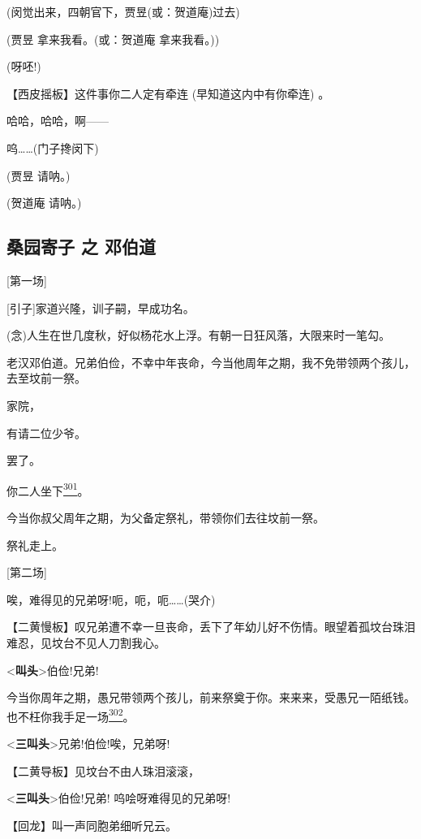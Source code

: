 (闵觉出来，四朝官下，贾昱(或：贺道庵)过去)

(贾昱 拿来我看。(或：贺道庵 拿来我看。))

(呀呸!)

【西皮摇板】这件事你二人定有牵连 (早知道这内中有你牵连) 。

哈哈，哈哈，啊------

呜\ldots{}\ldots{}(门子搀闵下)

(贾昱 请呐。)

(贺道庵 请呐。)

\hypertarget{ux6851ux56edux5bc4ux5b50-ux4e4b-ux9093ux4f2fux9053}{%
\subsection{桑园寄子 之
邓伯道}\label{ux6851ux56edux5bc4ux5b50-ux4e4b-ux9093ux4f2fux9053}}

{[}第一场{]}

{[}引子{]}家道兴隆，训子嗣，早成功名。

(念)人生在世几度秋，好似杨花水上浮。有朝一日狂风落，大限来时一笔勾。

老汉邓伯道。兄弟伯俭，不幸中年丧命，今当他周年之期，我不免带领两个孩儿，去至坟前一祭。

家院，

有请二位少爷。

罢了。

你二人坐下\protect\hyperlink{fn301}{\textsuperscript{301}}。

今当你叔父周年之期，为父备定祭礼，带领你们去往坟前一祭。

祭礼走上。

{[}第二场{]}

唉，难得见的兄弟呀!呃，呃，呃\ldots{}\ldots{}(哭介)

【二黄慢板】叹兄弟遭不幸一旦丧命，丢下了年幼儿好不伤情。眼望着孤坟台珠泪难忍，见坟台不见人刀割我心。

\textless{}\textbf{叫头}\textgreater{}伯俭!兄弟!

今当你周年之期，愚兄带领两个孩儿，前来祭奠于你。来来来，受愚兄一陌纸钱。也不枉你我手足一场\protect\hyperlink{fn302}{\textsuperscript{302}}。

\textless{}\textbf{三叫头}\textgreater{}兄弟!伯俭!唉，兄弟呀!

【二黄导板】见坟台不由人珠泪滚滚，

\textless{}\textbf{三叫头}\textgreater{}伯俭!兄弟! 呜哙呀难得见的兄弟呀!

【回龙】叫一声同胞弟细听兄云。

